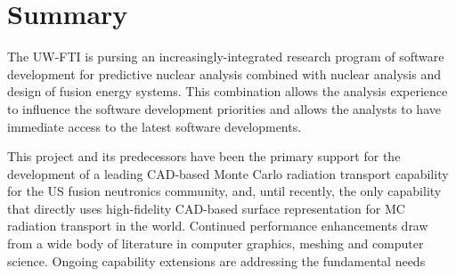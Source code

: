 \section{Summary}

The \gls{UW-FTI} is pursing an increasingly-integrated research program of
software development for predictive nuclear analysis combined with nuclear
analysis and design of fusion energy systems.  This combination allows the
analysis experience to influence the software development priorities and
allows the analysts to have immediate access to the latest software
developments.

This project and its predecessors have been the primary support for the
development of a leading CAD-based Monte Carlo radiation transport capability
for the US fusion neutronics community, and, until recently\cite{serpentCAD},
the only capability that directly uses high-fidelity CAD-based surface
representation for MC radiation transport in the world.  Continued performance
enhancements draw from a wide body of literature in computer graphics, meshing
and computer science.  Ongoing capability extensions are addressing the
fundamental needs
